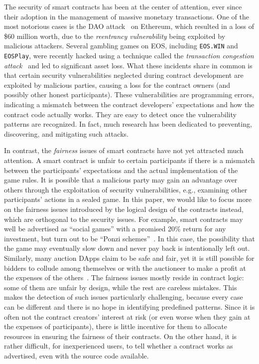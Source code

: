 The security of smart contracts has been at the center of attention, ever since their adoption in
the management of massive monetary transactions.
One of the most notorious cases is the DAO attack~\cite{DAO_attacks} on Ethereum, which resulted in
a loss of \$60 million worth, due to the \emph{reentrancy vulnerability} being exploited by
malicious attackers.
Several gambling games on EOS, including \texttt{EOS.WIN} and \texttt{EOSPlay}, were recently
hacked using a technique called the \emph{transaction congestion attack}~\cite{EOS_attacks} and led
to significant asset loss.
What these incidents share in common is that certain security vulnerabilities neglected during
contract development are exploited by malicious parties, causing a loss for the contract owners
(and possibly other honest participants).
These vulnerabilities are programming errors, indicating a mismatch between the contract
developers' expectations and how the contract code actually works.
They are easy to detect once the vulnerability patterns are recognized.
In fact, much research has been dedicated to preventing, discovering, and mitigating such attacks.

In contrast, the \emph{fairness} issues of smart contracts have not yet attracted much attention.
A smart contract is unfair to certain participants if there is a mismatch between the participants'
expectations and the actual implementation of the game rules.
It is possible that a malicious party may gain an advantage over others through the exploitation of
security vulnerabilities, e.g., examining other participants' actions in a sealed game.
In this paper, we would like to focus more on the fairness issues introduced by the logical design
of the contracts instead, which are orthogonal to the security issues.
For example, smart contracts may well be advertised as ``social games'' with a promised 20\% return
for any investment, but turn out to be ``Ponzi schemes''~\cite{BARTOLETTI2020259}.
In this case, the possibility that the game may eventually slow down and never pay back is
intentionally left out.
Similarly, many auction DApps claim to be safe and fair, yet it is still possible for bidders to
collude among themselves or with the auctioneer to make a profit at the expenses of the
others~\cite{wu2018cream}.
The fairness issues mostly reside in contract logic: some of them are unfair by design, while the
rest are careless mistakes.
This makes the detection of such issues particularly challenging, because every case can be
different and there is no hope in identifying predefined patterns.
Since it is often not the contract creators' interest at risk (or even worse when they gain at the
expenses of participants), there is little incentive for them to allocate resources in ensuring the
fairness of their contracts.
On the other hand, it is rather difficult, for inexperienced users, to tell whether a contract works
as advertised, even with the source code available.

